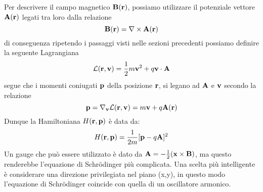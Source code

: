 Per descrivere il campo magnetico $\bold{B}(\bold{r})$, possiamo utilizzare il potenziale vettore $\bold{A}(\bold{r})$ legati tra loro dalla relazione 
\begin{equation*}
	\bold{B}(\bold{r}) = \nabla \times \bold{A}(\bold{r})
\end{equation*}
di conseguenza ripetendo i passaggi visti nelle sezioni precedenti possiamo definire la seguente Lagrangiana
\begin{equation*}
	\mathcal{L}(\bold{r},\bold{v}) = \frac{1}{2}m \bold{v}^2 + q \bold{v} \cdot \bold{A}
\end{equation*}
segue che i momenti coniugati $\bold{p}$ della posizione $\bold{r}$, si legano ad $\bold{A}$ e $\bold{v}$ secondo la relazione
\begin{equation*}
	\bold{p} = \nabla_{\bold{v}}\mathcal{L}(\bold{r},\bold{v}) = m \bold{v} + q \bold{A}(\bold{r})
\end{equation*}
Dunque la Hamiltoniana $H(\bold{r},\bold{p})$ \`e data da:
\begin{equation*}
	H(\bold{r},\bold{p}) = \frac{1}{2m}[\bold{p} - q \bold{A}]^2
\end{equation*}
Un gauge che pu\`o essere utilizzato \`e dato da $\bold{A} = -\frac{1}{2}(\bold{x} \times \bold{B})$, ma questo renderebbe l'equazione di Schr\"odinger pi\`u complicata. Una scelta pi\`u intelligente \`e considerare una direzione privilegiata nel piano (x,y), in questo modo l'equazione di Schr\"odinger coincide con quella di un oscillatore armonico. 

\newpage

